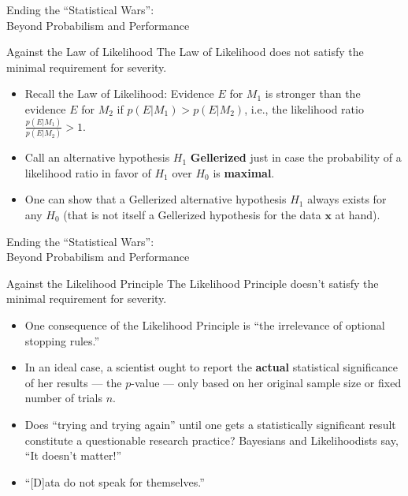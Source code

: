 \documentclass{beamer}
\begin{document}
\begin{frame}{Ending the ``Statistical Wars'':\\Beyond Probabilism and Performance}

\begin{block}{Against the Law of Likelihood}
The Law of Likelihood does not satisfy the minimal requirement for severity.
\end{block}
	\begin{itemize}

	\item Recall the Law of Likelihood: Evidence $E$ for $M_{1}$ is stronger than the evidence $E$ for $M_{2}$ if $p(E| M_{1}) > p(E | M_{2})$, i.e., the likelihood ratio $\frac{p(E|M_{1})}{p(E|M_{2})}>1$.

	\item Call an alternative hypothesis $H_{1}$ \textbf{Gellerized} just in case the probability of a likelihood ratio in favor of $H_{1}$ over $H_{0}$ is \textbf{maximal}.
	\item One can show that a Gellerized alternative hypothesis $H_{1}$ always exists for any $H_{0}$ (that is not itself a Gellerized hypothesis for the data $\textbf{x}$ at hand).

	\end{itemize}

	
\end{frame}


\begin{frame}{Ending the ``Statistical Wars'':\\Beyond Probabilism and Performance}

\begin{block}{Against the Likelihood Principle}
The Likelihood Principle doesn't satisfy the minimal requirement for severity.
\end{block}
\begin{itemize}
\item One consequence of the Likelihood Principle is ``the irrelevance of optional stopping rules.''
\item In an ideal case, a scientist ought to report the \textbf{actual} statistical significance of her results --- the $p$-value --- only based on her original sample size or fixed number of trials $n$. 
\item Does ``trying and trying again'' until one gets a statistically significant result constitute a questionable research practice? \alert{Bayesians and Likelihoodists say, ``It doesn't matter!''}
\item \alert{``[D]ata do not speak for themselves.''} \citep[439]{Mayo2018}

\end{itemize}
	
\end{frame}
	
\end{document}

